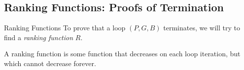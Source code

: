 \documentclass[xcolor=pdftex,t,11pt]{beamer}
\begin{document}
\subsection{Ranking Functions: Proofs of Termination}

\begin{frame}[fragile]{Ranking Functions}
 To prove that a loop $(P, G, B)$ terminates, we will try to find a \emph{ranking function} $R$.
 
 \vspace{1em}
 
 A ranking function is some function that decreases on each loop iteration, but which cannot decrease forever.
 
%  
\end{frame}
\end{document}
